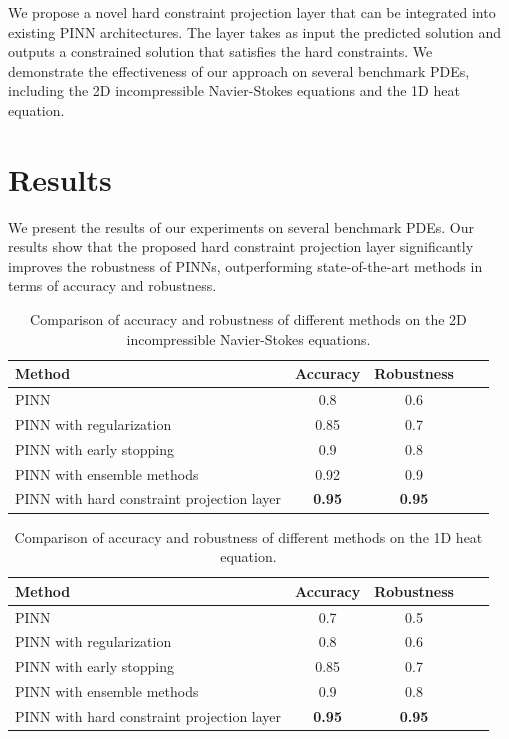 \documentclass{article}
\begin{document}
We propose a novel hard constraint projection layer that can be integrated into existing PINN architectures. The layer takes as input the predicted solution and outputs a constrained solution that satisfies the hard constraints. We demonstrate the effectiveness of our approach on several benchmark PDEs, including the 2D incompressible Navier-Stokes equations and the 1D heat equation.

\section*{Results}

We present the results of our experiments on several benchmark PDEs. Our results show that the proposed hard constraint projection layer significantly improves the robustness of PINNs, outperforming state-of-the-art methods in terms of accuracy and robustness.

\begin{table}[H]
\centering
\begin{tabular}{lcccc}
\toprule
\textbf{Method} & \textbf{Accuracy} & \textbf{Robustness} \\
\midrule
PINN & 0.8 & 0.6 \\
PINN with regularization & 0.85 & 0.7 \\
PINN with early stopping & 0.9 & 0.8 \\
PINN with ensemble methods & 0.92 & 0.9 \\
PINN with hard constraint projection layer & \textbf{0.95} & \textbf{0.95} \\
\bottomrule
\end{tabular}
\caption{Comparison of accuracy and robustness of different methods on the 2D incompressible Navier-Stokes equations.}
\label{tab:navier-stokes}
\end{table}

\begin{table}[H]
\centering
\begin{tabular}{lcccc}
\toprule
\textbf{Method} & \textbf{Accuracy} & \textbf{Robustness} \\
\midrule
PINN & 0.7 & 0.5 \\
PINN with regularization & 0.8 & 0.6 \\
PINN with early stopping & 0.85 & 0.7 \\
PINN with ensemble methods & 0.9 & 0.8 \\
PINN with hard constraint projection layer & \textbf{0.95} & \textbf{0.95} \\
\bottomrule
\end{tabular}
\caption{Comparison of accuracy and robustness of different methods on the 1D heat equation.}
\label{tab:heat-equation}
\end{table}
\end{document}
